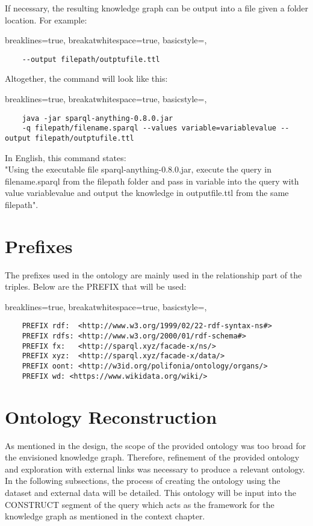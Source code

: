 \noindent If necessary, the resulting knowledge graph can be output into a file given a folder location. For example:

\lstset
{
    breaklines=true,
    breakatwhitespace=true,
    basicstyle=\ttfamily,
}
\begin{lstlisting}
    --output filepath/outptufile.ttl
\end{lstlisting}

\noindent Altogether, the command will look like this:

\lstset
{
    breaklines=true,
    breakatwhitespace=true,
    basicstyle=\ttfamily,
}
\begin{lstlisting}
    java -jar sparql-anything-0.8.0.jar
    -q filepath/filename.sparql --values variable=variablevalue --output filepath/outptufile.ttl
\end{lstlisting}

\noindent In English, this command states: \\
\hspace*{0.5cm} "Using the executable file sparql-anything-0.8.0.jar, execute the query in filename.sparql from the filepath folder and pass in variable into the query with value variablevalue and output the knowledge in outputfile.ttl from the same filepath". 

\section{Prefixes}
\hspace*{0.5cm} The prefixes used in the ontology are mainly used in the relationship part of the triples. Below are the PREFIX that will be used:

\lstset
{
    breaklines=true,
    breakatwhitespace=true,
    basicstyle=\ttfamily,
}
\begin{lstlisting}
    PREFIX rdf:  <http://www.w3.org/1999/02/22-rdf-syntax-ns#>
    PREFIX rdfs: <http://www.w3.org/2000/01/rdf-schema#>
    PREFIX fx:   <http://sparql.xyz/facade-x/ns/>
    PREFIX xyz:  <http://sparql.xyz/facade-x/data/>
    PREFIX oont: <http://w3id.org/polifonia/ontology/organs/>
    PREFIX wd: <https://www.wikidata.org/wiki/> 
\end{lstlisting}

\section{Ontology Reconstruction}
\hspace*{0.5cm} As mentioned in the design, the scope of the provided ontology was too broad for the envisioned knowledge graph. Therefore, refinement of the provided ontology and exploration with external links was necessary to produce a relevant ontology. In the following subsections, the process of creating the ontology using the dataset and external data will be detailed. This ontology will be input into the CONSTRUCT segment of the query which acts as the framework for the knowledge graph as mentioned in the context chapter. 

